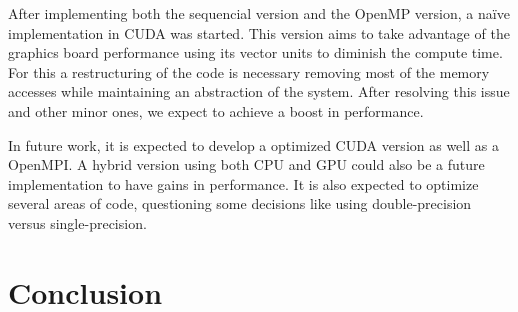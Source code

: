 \documentclass[a4paper,10pt,openright,openbib,twocolumn]{article}
\begin{document}
After implementing both the sequencial version and the OpenMP version, a na\"{i}ve implementation in CUDA was started. This version aims to take advantage of the graphics board performance using its vector units to diminish the compute time. For this a restructuring of the code is necessary removing most of the memory accesses while maintaining an abstraction of the system. After resolving this issue and other minor ones, we expect to achieve a boost in performance.

In future work, it is expected to develop a optimized CUDA version as well as a OpenMPI. A hybrid version using both CPU and GPU could also be a future implementation to have gains in performance. It is also expected to optimize several areas of code, questioning some decisions like using double-precision versus single-precision. 

\section{Conclusion}

\end{document}
